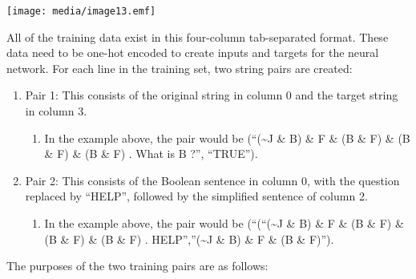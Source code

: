 \documentclass[
]{article}
\begin{document}
\texttt{[image: media/image13.emf]}

All of the training data exist in this four-column tab-separated format.
These data need to be one-hot encoded to create inputs and targets for
the neural network. For each line in the training set, two string pairs
are created:

\begin{enumerate}
\def\labelenumi{\arabic{enumi}.}
\item
  Pair 1: This consists of the original string in column 0 and the
  target string in column 3.

  \begin{enumerate}
  \def\labelenumii{\alph{enumii}.}
  \item
    In the example above, the pair would be (``(\textasciitilde J \& B)
    \& F \& (B \& F) \& (B \& F) \& (B \& F) . What is B ?'', ``TRUE'').
  \end{enumerate}
\item
  Pair 2: This consists of the Boolean sentence in column 0, with the
  question replaced by ``HELP'', followed by the simplified sentence of
  column 2.

  \begin{enumerate}
  \def\labelenumii{\alph{enumii}.}
  \item
    In the example above, the pair would be (``(``(\textasciitilde J \&
    B) \& F \& (B \& F) \& (B \& F) \& (B \& F) .
    HELP'',''(\textasciitilde J \& B) \& F \& (B \& F)'').
  \end{enumerate}
\end{enumerate}

The purposes of the two training pairs are as follows:
\end{document}
